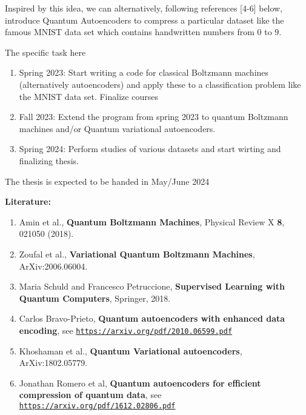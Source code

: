 \documentclass{article}
\begin{document}
Inspired by this idea, we can alternatively, following references [4-6]
below, introduce Quantum Autoencoders to compress a particular
dataset like the famous MNIST data set which contains handwritten
numbers from $0$ to $9$.


The specific task here 

\begin{enumerate}
    \item Spring 2023: Start writing a code for classical Boltzmann machines (alternatively autoencoders) and apply these to a classification problem like the MNIST data set. Finalize courses
    \item Fall 2023: Extend the program from spring 2023 to quantum Boltzmann machines and/or Quantum variational autoencoders.
    \item Spring 2024: Perform studies of various datasets and start wirting and finalizing thesis.
\end{enumerate}
The thesis is expected to be handed in May/June 2024

\textbf{Literature:}

\begin{enumerate}
\item Amin et al., \textbf{Quantum Boltzmann Machines}, Physical Review X \textbf{8}, 021050 (2018).

\item Zoufal et al., \textbf{Variational Quantum Boltzmann Machines}, ArXiv:2006.06004.

\item Maria Schuld and Francesco Petruccione, \textbf{Supervised Learning with Quantum Computers}, Springer, 2018.

\item Carlos Bravo-Prieto, \textbf{Quantum autoencoders with enhanced data encoding}, see \href{{https://arxiv.org/pdf/2010.06599.pdf}}{\nolinkurl{https://arxiv.org/pdf/2010.06599.pdf}} 

\item Khoshaman et al., \textbf{Quantum Variational autoencoders}, ArXiv:1802.05779.
  
\item Jonathan Romero et al, \textbf{Quantum autoencoders for efficient compression of quantum data}, see \href{{https://arxiv.org/pdf/1612.02806.pdf}}{\nolinkurl{https://arxiv.org/pdf/1612.02806.pdf}}


\end{enumerate}
\end{document}
